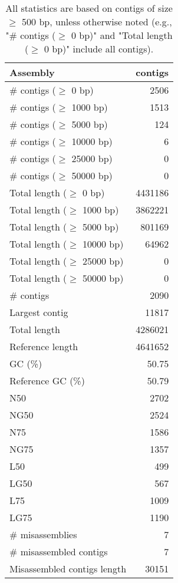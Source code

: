 \documentclass[12pt,a4paper]{article}
\begin{document}
\begin{table}[ht]
\begin{center}
\caption{All statistics are based on contigs of size $\geq$ 500 bp, unless otherwise noted (e.g., "\# contigs ($\geq$ 0 bp)" and "Total length ($\geq$ 0 bp)" include all contigs).}
\begin{tabular}{|l*{1}{|r}|}
\hline
Assembly & contigs \\ \hline
\# contigs ($\geq$ 0 bp) & 2506 \\ \hline
\# contigs ($\geq$ 1000 bp) & 1513 \\ \hline
\# contigs ($\geq$ 5000 bp) & 124 \\ \hline
\# contigs ($\geq$ 10000 bp) & 6 \\ \hline
\# contigs ($\geq$ 25000 bp) & 0 \\ \hline
\# contigs ($\geq$ 50000 bp) & 0 \\ \hline
Total length ($\geq$ 0 bp) & 4431186 \\ \hline
Total length ($\geq$ 1000 bp) & 3862221 \\ \hline
Total length ($\geq$ 5000 bp) & 801169 \\ \hline
Total length ($\geq$ 10000 bp) & 64962 \\ \hline
Total length ($\geq$ 25000 bp) & 0 \\ \hline
Total length ($\geq$ 50000 bp) & 0 \\ \hline
\# contigs & 2090 \\ \hline
Largest contig & 11817 \\ \hline
Total length & 4286021 \\ \hline
Reference length & 4641652 \\ \hline
GC (\%) & 50.75 \\ \hline
Reference GC (\%) & 50.79 \\ \hline
N50 & 2702 \\ \hline
NG50 & 2524 \\ \hline
N75 & 1586 \\ \hline
NG75 & 1357 \\ \hline
L50 & 499 \\ \hline
LG50 & 567 \\ \hline
L75 & 1009 \\ \hline
LG75 & 1190 \\ \hline
\# misassemblies & 7 \\ \hline
\# misassembled contigs & 7 \\ \hline
Misassembled contigs length & 30151 \\ \hline

\end{tabular}
\end{center}
\end{table}
\end{document}
